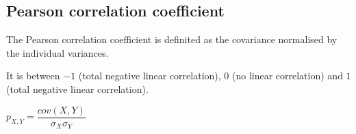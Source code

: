 
\subsection{Pearson correlation coefficient}

The Pearson correlation coefficient is definited as the covariance normalised by the individual variances.

It is between \(-1\) (total negative linear correlation), \(0\) (no linear correlation) and \(1\) (total negative linear correlation). 

\(p_{X,Y}=\dfrac{cov (X,Y)}{\sigma_X\sigma_Y}\)

